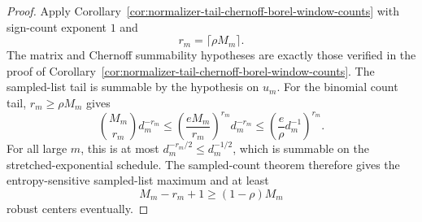 \documentclass[11pt]{amsart}
\numberwithin{equation}{section}
\theoremstyle{definition}
\theoremstyle{remark}
\begin{document}
\begin{proof}
Apply Corollary~\ref{cor:normalizer-tail-chernoff-borel-window-counts} with
sign-count exponent \(1\) and
\[
  r_m=\lceil\rho M_m\rceil .
\]
The matrix and Chernoff summability hypotheses are exactly those verified in the
proof of Corollary~\ref{cor:normalizer-tail-chernoff-borel-window-counts}.  The
sampled-list tail is summable by the hypothesis on \(u_m\).  For the binomial
count tail, \(r_m\ge\rho M_m\) gives
\[
  \binom{M_m}{r_m}d_m^{-r_m}
  \le \left(\frac{eM_m}{r_m}\right)^{r_m}d_m^{-r_m}
  \le \left(\frac{e}{\rho}d_m^{-1}\right)^{r_m}.
\]
For all large \(m\), this is at most \(d_m^{-r_m/2}\le d_m^{-1/2}\), which is
summable on the stretched-exponential schedule.  The sampled-count theorem
therefore gives the entropy-sensitive sampled-list maximum and at least
\[
  M_m-r_m+1\ge (1-\rho)M_m
\]
robust centers eventually.
\end{proof}
\end{document}
